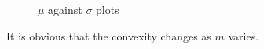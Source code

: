 \documentclass[a4paper]{article}
\begin{document}
\begin{figure}
\caption{$\mu$ against $\sigma$ plots}
\end{figure}

It is obvious that the convexity changes as $m$ varies.
\end{document}
